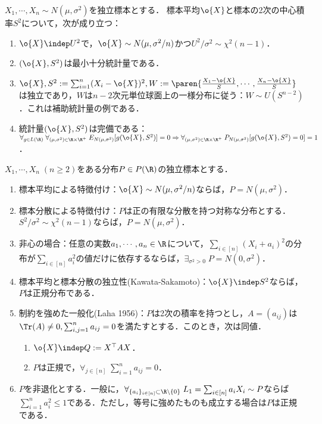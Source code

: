 \documentclass[uplatex,dvipdfmx]{jsreport}
\begin{document}
\begin{theorem}
    $X_1,\cdots,X_n\sim N(\mu,\sigma^2)$を独立標本とする．
    標本平均$\o{X}$と標本の2次の中心積率$S^2$について，次が成り立つ：
    \begin{enumerate}
        \item $\o{X}\indep U^2$で，$\o{X}\sim N(\mu,\sigma^2/n)$かつ$U^2/\sigma^2\sim\chi^2(n-1)$．
        \item $(\o{X},S^2)$は最小十分統計量である．
        \item $\o{X},S^2:=\sum_{i=1}^n(X_i-\o{X})^2,W:=\paren{\frac{X_1-\o{X}}{S},\cdots,\frac{X_n-\o{X}}{S}}$は独立であり，$W$は$n-2$次元単位球面上の一様分布に従う：$W\sim U(S^{n-2})$．これは補助統計量の例である．
        \item 統計量$(\o{X},S^2)$は完備である：$\forall_{g\in L(\R)}\;\forall_{(\mu,\sigma^2)\in\R\times\R^+}\;E_{N(\mu,\sigma^2)}[g(\o{X},S^2)]=0\Rightarrow \forall_{(\mu,\sigma^2)\in\R\times\R^+}\;P_{N(\mu,\sigma^2)}[g(\o{X},S^2)=0]=1$．
    \end{enumerate}
\end{theorem}

\begin{theorem}
    $X_1,\cdots,X_n\;(n\ge2)$をある分布$P\in P(\R)$の独立標本とする．
    \begin{enumerate}
        \item 標本平均による特徴付け：$\o{X}\sim N(\mu,\sigma^2/n)$ならば，$P=N(\mu,\sigma^2)$．
        \item 標本分散による特徴付け：$P$は正の有限な分散を持つ対称な分布とする．$S^2/\sigma^2\sim\chi^2(n-1)$ならば，$P=N(\mu,\sigma^2)$．
        \item 非心の場合：任意の実数$a_1,\cdots,a_n\in\R$について，$\sum_{i\in[n]}(X_i+a_i)^2$の分布が$\sum_{i\in[n]}a_i^2$の値だけに依存するならば，$\exists_{\sigma^2>0}\;P=N(0,\sigma^2)$．
        \item 標本平均と標本分散の独立性(Kawata-Sakamoto)：$\o{X}\indep S^2$ならば，$P$は正規分布である．
        \item 制約を強めた一般化(Laha 1956)：$P$は2次の積率を持つとし，$A=(a_{ij})$は$\Tr(A)\ne0,\sum_{i,j=1}^na_{ij}=0$を満たすとする．このとき，次は同値．
        \begin{enumerate}
            \item $\o{X}\indep Q:=X^\top AX$．
            \item $P$は正規で，$\forall_{j\in[n]}\;\sum_{i=1}^na_{ij}=0$．
        \end{enumerate}
        \item $P$を非退化とする．一般に，$\forall_{\{a_i\}_{i\in[n]}\subset\R\setminus\{0\}}\;L_1=\sum_{i\in[n]}a_iX_i\sim P$ならば$\sum_{i=1}^na_i^2\le1$である．ただし，等号に強めたものも成立する場合は$P$は正規である．
    \end{enumerate}
\end{theorem}
\end{document}
